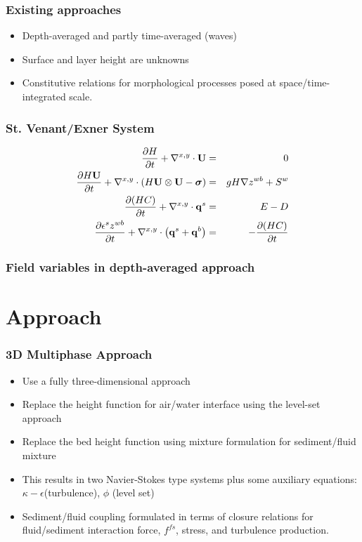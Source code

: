 \documentclass{beamer}
\begin{document}
\begin{frame}
\frametitle{Existing approaches}
\begin{itemize}
\item Depth-averaged and partly time-averaged (waves)
\item Surface and layer height are unknowns
\item Constitutive relations for morphological processes posed at space/time-integrated scale.
\end{itemize}
\end{frame}

\begin{frame}
\frametitle{St. Venant/Exner System}
\begin{eqnarray}
  \pd{H}{t} + \nabla^{x,y} \cdot \vec U &=& 0\\ %
  \pd{H \vec U}{t} + \nabla^{x,y} \cdot \pl H \vec U \otimes \vec U - \ten{\sigma} \pr  &=& g H \grad{z^{wb}} + S^w \\ %
  \pd{\pl H C \pr}{t} + \nabla^{x,y}\cdot \vec q^s &=& E - D \\ %
  \pd{\epsilon^s z^{wb}}{t} + \nabla^{x,y} \cdot \pl \vec q^s + \vec q^b \pr &=& - \pd{\pl H C \pr}{t} %
\end{eqnarray}
\end{frame}

\begin{frame}
\frametitle{Field variables in depth-averaged approach}
\begin{center}
  \def\svgwidth{\textwidth}
  
\end{center}
\end{frame}

\section{Approach}

\begin{frame}
\frametitle{3D Multiphase Approach}
\begin{itemize}
\item Use a fully three-dimensional approach
\item Replace the height function for air/water interface using the level-set approach
\item Replace the bed height function using mixture formulation for sediment/fluid mixture
\item This results in two Navier-Stokes type systems plus some auxiliary equations: $\kappa-\epsilon$(turbulence), $\phi$ (level set)
\item Sediment/fluid coupling formulated in terms of closure relations for fluid/sediment interaction force, $f^{fs}$, stress, and turbulence production.
\end{itemize}
\end{frame}
\end{document}
